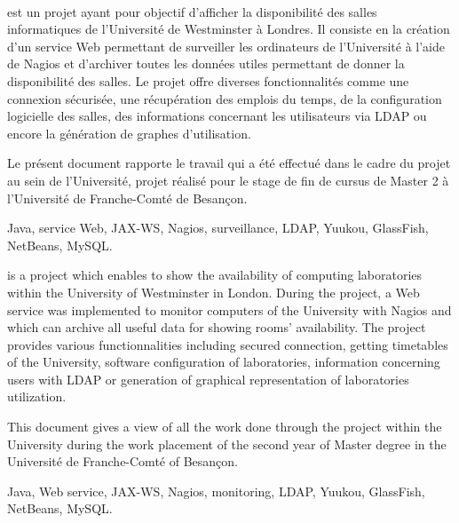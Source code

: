 ~
\vfill


{\YuukouII} est un projet ayant pour objectif d'afficher la disponibilit\'e des salles informatiques de l'Universit\'e de Westminster \`a Londres.
Il consiste en la cr\'eation d'un service Web permettant de surveiller les ordinateurs de l'Universit\'e \`a l'aide de Nagios et d'archiver toutes les donn\'ees utiles permettant de donner la disponibilit\'e des salles.
Le projet offre diverses fonctionnalit\'es comme une connexion s\'ecuris\'ee, une r\'ecup\'eration des emplois du temps, de la configuration logicielle des salles, des informations concernant les utilisateurs via LDAP ou encore la g\'en\'eration de graphes d'utilisation.

Le pr\'esent document rapporte le travail qui a \'et\'e effectu\'e dans le cadre du projet {\YuukouII} au sein de l'Universit\'e, projet r\'ealis\'e pour le stage de fin de cursus de Master 2 \`a l'Universit\'e de Franche-Comt\'e de Besan\c{c}on.

\vspace{0.5cm}


Java, service Web, JAX-WS, Nagios, surveillance, LDAP, Yuukou, GlassFish, NetBeans, MySQL.

\vspace{1cm}


{\YuukouII} is a project which enables to show the availability of computing laboratories within the University of Westminster in London.
During the project, a Web service was implemented to monitor computers of the University with Nagios and which can archive all useful data for showing rooms' availability.
The project provides various functionnalities including secured connection, getting timetables of the University, software configuration of laboratories, information concerning users with LDAP or generation of graphical representation of laboratories utilization.

This document gives a view of all the work done through the project {\YuukouII} within the University during the work placement of the second year of Master degree in the Universit\'e de Franche-Comt\'e of Besan\c{c}on.

\vspace{0.5cm}


Java, Web service, JAX-WS, Nagios, monitoring, LDAP, Yuukou, GlassFish, NetBeans, MySQL.

\vfill
